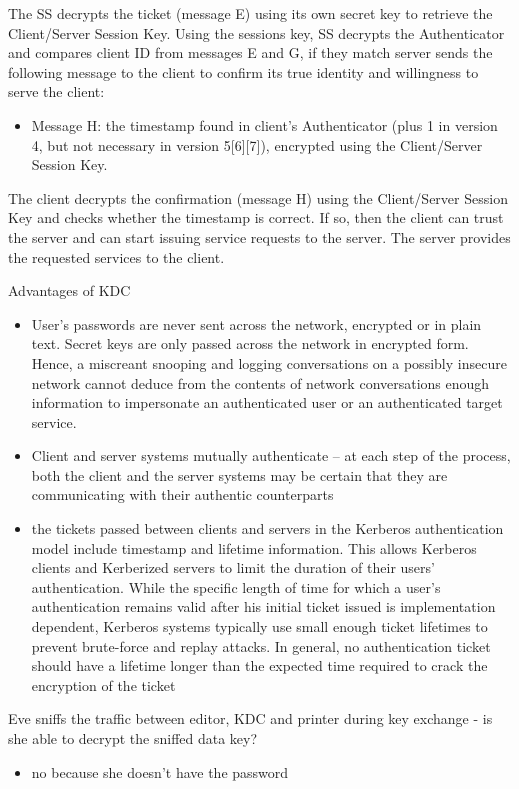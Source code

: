 \documentclass[11pt]{article}
\begin{document}
The SS decrypts the ticket (message E) using its own secret key to retrieve the Client/Server Session Key. Using the sessions key, SS decrypts the Authenticator and compares client ID from messages E and G, if they match server sends the following message to the client to confirm its true identity and willingness to serve the client:
\begin{itemize}
\item Message H: the timestamp found in client's Authenticator (plus 1 in version 4, but not necessary in version 5[6][7]), encrypted using the Client/Server Session Key.
\end{itemize}

The client decrypts the confirmation (message H) using the Client/Server Session Key and checks whether the timestamp is correct. If so, then the client can trust the server and can start issuing service requests to the server.
The server provides the requested services to the client.  

Advantages of KDC
\begin{itemize}
\item User's passwords are never sent across the network, encrypted or in plain text. Secret keys are only passed across the network in encrypted form. Hence, a miscreant snooping and logging conversations on a possibly insecure network cannot deduce from the contents of network conversations enough information to impersonate an authenticated user or an authenticated target service.
\item Client and server systems mutually authenticate -- at each step of the process, both the client and the server systems may be certain that they are communicating with their authentic counterparts
\item the tickets passed between clients and servers in the Kerberos authentication model include timestamp and lifetime information. This allows Kerberos clients and Kerberized servers to limit the duration of their users' authentication. While the specific length of time for which a user's authentication remains valid after his initial ticket issued is implementation dependent, Kerberos systems typically use small enough ticket lifetimes to prevent brute-force and replay attacks. In general, no authentication ticket should have a lifetime longer than the expected time required to crack the encryption of the ticket
\end{itemize}

Eve sniffs the traffic between editor, KDC and printer during key exchange - is she able to decrypt the sniffed data key?
\begin{itemize}
\item no because she doesn't have the password
\end{itemize}
\end{document}
